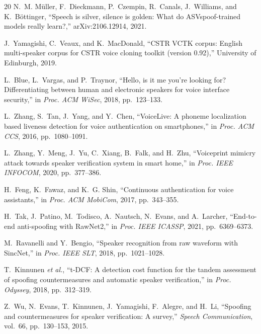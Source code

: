 \documentclass[conference]{IEEEtran}
\begin{document}
\begin{thebibliography}{20}
N.~M. M\"uller, F.~Dieckmann, P.~Czempin, R.~Canals, J.~Williams, and
K.~B\"ottinger, ``Speech is silver, silence is golden: What do ASVspoof-trained
models really learn?,'' arXiv:2106.12914, 2021.

J.~Yamagishi, C.~Veaux, and K.~MacDonald, ``CSTR VCTK corpus: English
multi-speaker corpus for CSTR voice cloning toolkit (version 0.92),''
University of Edinburgh, 2019.

L.~Blue, L.~Vargas, and P.~Traynor, ``Hello, is it me you're looking for?
Differentiating between human and electronic speakers for voice interface
security,'' in \emph{Proc. ACM WiSec}, 2018, pp.~123--133.

L.~Zhang, S.~Tan, J.~Yang, and Y.~Chen, ``VoiceLive: A phoneme localization
based liveness detection for voice authentication on smartphones,'' in
\emph{Proc. ACM CCS}, 2016, pp.~1080--1091.

L.~Zhang, Y.~Meng, J.~Yu, C.~Xiang, B.~Falk, and H.~Zhu, ``Voiceprint mimicry
attack towards speaker verification system in smart home,'' in \emph{Proc. IEEE
INFOCOM}, 2020, pp.~377--386.

H.~Feng, K.~Fawaz, and K.~G. Shin, ``Continuous authentication for voice
assistants,'' in \emph{Proc. ACM MobiCom}, 2017, pp.~343--355.

H.~Tak, J.~Patino, M.~Todisco, A.~Nautsch, N.~Evans, and A.~Larcher,
``End-to-end anti-spoofing with RawNet2,'' in \emph{Proc. IEEE ICASSP}, 2021,
pp.~6369--6373.

M.~Ravanelli and Y.~Bengio, ``Speaker recognition from raw waveform with
SincNet,'' in \emph{Proc. IEEE SLT}, 2018, pp.~1021--1028.

T.~Kinnunen \emph{et al.}, ``t-DCF: A detection cost function for the tandem
assessment of spoofing countermeasures and automatic speaker verification,'' in
\emph{Proc. Odyssey}, 2018, pp.~312--319.

Z.~Wu, N.~Evans, T.~Kinnunen, J.~Yamagishi, F.~Alegre, and H.~Li, ``Spoofing
and countermeasures for speaker verification: A survey,'' \emph{Speech
Communication}, vol.~66, pp.~130--153, 2015.

\end{thebibliography}
\end{document}
